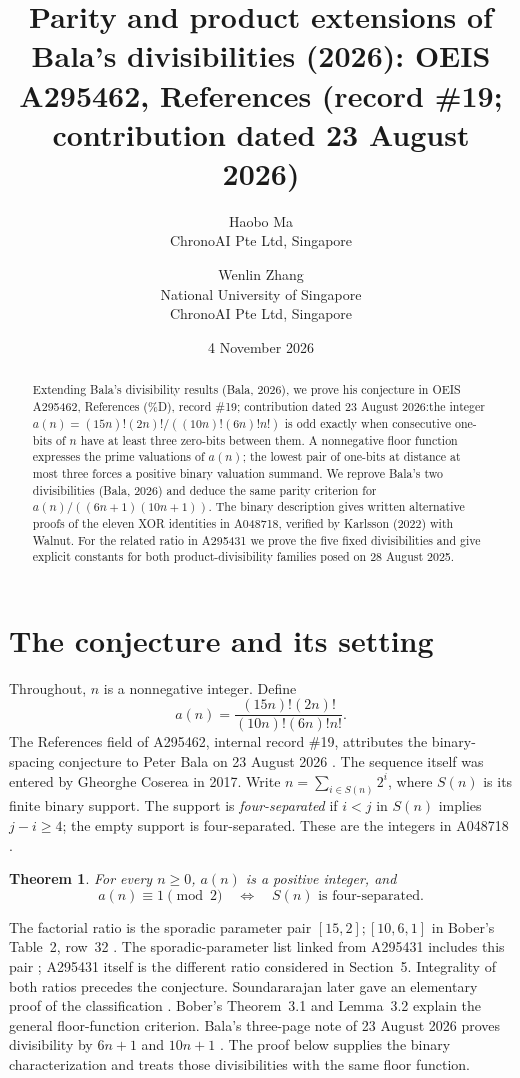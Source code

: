 \documentclass[11pt]{article}
\title{Parity and product extensions of Bala's divisibilities (2026): OEIS A295462, References (record \#19; contribution dated 23 August 2026)}
\author{Haobo Ma\\\small ChronoAI Pte Ltd, Singapore
\and Wenlin Zhang\\\small National University of Singapore\\\small ChronoAI Pte Ltd, Singapore}
\date{4 November 2026}
\newtheorem{theorem}{Theorem}
\begin{document}
\maketitle
\begin{abstract}
Extending Bala's divisibility results (Bala, 2026), we prove his
conjecture in OEIS A295462, References (\%D),
record \#19; contribution dated 23 August 2026:\newline the integer
$a(n)=(15n)!(2n)!/((10n)!(6n)!n!)$ is odd exactly when consecutive
one-bits of $n$ have at least three zero-bits between them.
A nonnegative floor function expresses the prime valuations of $a(n)$;
the lowest pair of one-bits at distance at most three forces a positive
binary valuation summand. We reprove Bala's two divisibilities
(Bala, 2026) and deduce the same parity criterion for
$a(n)/((6n+1)(10n+1))$. The binary description gives written alternative
proofs of the eleven XOR identities in A048718, verified by
Karlsson (2022) with Walnut. For the related ratio
in A295431 we prove the five fixed divisibilities and give explicit
constants for both product-divisibility families posed on 28 August 2025.
\end{abstract}

\section{The conjecture and its setting}
Throughout, $n$ is a nonnegative integer. Define
\begin{equation}\label{eq:a}
 a(n)=\frac{(15n)!(2n)!}{(10n)!(6n)!n!}.
\end{equation}
The References field of A295462, internal record \#19, attributes the
binary-spacing conjecture to Peter Bala on 23 August 2026 \cite{oeis}.
The sequence itself was entered by Gheorghe Coserea in 2017.
Write $n=\sum_{i\in S(n)}2^i$, where $S(n)$ is its finite binary support.
The support is \emph{four-separated} if $i<j$ in $S(n)$ implies $j-i\geq4$;
the empty support is four-separated. These are the integers in A048718
\cite{spaced}.

\begin{theorem}\label{thm:main}
For every $n\geq0$, $a(n)$ is a positive integer, and
\[
 a(n)\equiv1\pmod2
 \quad\Longleftrightarrow\quad S(n)\text{ is four-separated}.
\]
\end{theorem}

The factorial ratio is the sporadic parameter pair $[15,2];[10,6,1]$
in Bober's Table~2, row~32 \cite{bober}. The sporadic-parameter list
linked from A295431 includes this pair \cite{sporadic}; A295431 itself
is the different ratio considered in Section~5. Integrality of both ratios precedes
the conjecture. Soundararajan later gave an elementary proof of the
classification \cite{sound}. Bober's Theorem~3.1 and Lemma~3.2 explain the general
floor-function criterion. Bala's three-page note of 23 August 2026
proves divisibility by $6n+1$ and $10n+1$ \cite{bala}.
The proof below supplies the binary characterization and treats those
divisibilities with the same floor function.
\end{document}
